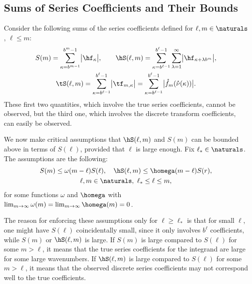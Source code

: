 \documentclass[]{elsarticle}
\theoremstyle{definition}
\newcommand{\rnu}{\mathring{\nu}}
\begin{document}
\subsection{Sums of Series Coefficients and Their Bounds}
Consider the following sums of the series coefficients defined for $\ell,m \in \naturals$, $\ell \le m$:
\begin{gather*}
S(m) =  \sum_{\kappa=b^{m-1}}^{b^{m}-1} \bigl \lvert \hf_{\kappa} \bigr \rvert, \qquad 
\hS(\ell,m)  = \sum_{\kappa=b^{\ell-1}}^{b^{\ell}-1} \sum_{\lambda=1}^{\infty} \bigl \lvert \hf_{\kappa+\lambda b^{m}}\bigr\rvert, \\
\tS(\ell,m) = \sum_{\kappa=b^{\ell-1}}^{b^{\ell}-1} \bigl \lvert \tf_{m,\kappa}\bigr\rvert = \sum_{\kappa=b^{\ell-1}}^{b^{\ell}-1} \bigl \lvert \mathring{f}_m(\rnu(\kappa)) \bigr\rvert .
\end{gather*}
These first two quantities, which involve the true series coefficients, cannot be observed, but the third one, which involves the discrete transform coefficients, can easily be observed.

We now make critical assumptions that $\hS(\ell,m)$ and $S(m)$ can be bounded above in terms of $S(\ell)$, provided that $\ell$ is large enough.  Fix $\ell_* \in \naturals$.  The assumptions are the following:
\begin{multline}
S(m) \le \omega(m-\ell) S(\ell), \quad \hS(\ell,m) \le \homega(m-\ell) S(r), \\ 
\ell,m \in \naturals, \ \ell_* \le \ell \le m,
\end{multline}
for some functions $\omega$ and $\homega$ with $\lim_{m \to \infty} \omega(m) = \lim_{m \to \infty} \homega(m) = 0$.  

The reason for enforcing these assumptions only  for $\ell \ge \ell_*$ is that for small $\ell$, one might have $S(\ell)$ coincidentally small, since it only involves $b^\ell$ coefficients, while $S(m)$ or $\hS(\ell,m)$ is large.  If $S(m)$ is large compared to $S(\ell)$ for some $m > \ell$, it means that the true series coefficients for the integrand are large for some large wavenumbers.  If $\hS(\ell,m)$ is large compared to $S(\ell)$ for some $m > \ell$, it means that the observed discrete series coefficients may not correspond well to the true coefficients.
\end{document}
